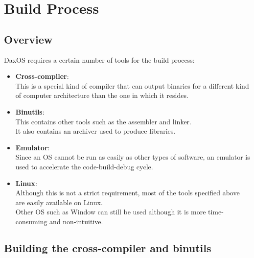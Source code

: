 \chapter{Build Process}\label{chapter:Build Process}

\section{Overview}\label{section:Overview}

DaxOS requires a certain number of tools for the build process:
\begin{itemize}
    \item \textbf{Cross-compiler}:\\
        This is a special kind of compiler that can output binaries for a different kind of computer architecture
        than the one in which it resides.

    \item \textbf{Binutils}:\\
        This contains other tools such as the assembler and linker.\\
        It also contains an archiver used to produce libraries.

    \item \textbf{Emulator}:\\
        Since an OS cannot be run as easily as other types of software, an emulator is used to accelerate the code-build-debug cycle.

    \item \textbf{Linux}:\\
        Although this is not a strict requirement, most of the tools specified above are easily available on Linux. \\
        Other OS such as Window can still be used although it is more time-consuming and non-intuitive.
\end{itemize}

\section{Building the cross-compiler and binutils}\label{section:Building the cross-compiler and binutils}

